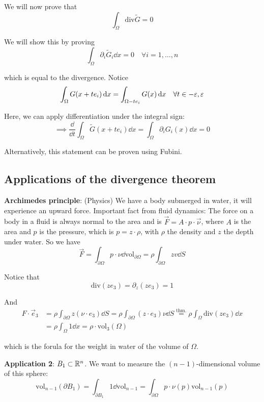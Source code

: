 \documentclass[12pt]{article}
\begin{document}
\begin{proofbox}
    We will now prove that
    $$
        \int_\Omega \mathrm{div} \tilde G = 0
    $$

    We will show this by proving
    $$
        \int_\Omega \partial_i \tilde G_i \dd x = 0 \quad \forall i = 1,\dots,n
    $$

    which is equal to the divergence. Notice
    $$
        \int_\Omega G (x + te_i) \mathop{}\!\mathrm{d} x = \int_{\Omega - te_i} G(x) \mathop{}\!\mathrm{d} x \quad \forall t \in {-\varepsilon, \varepsilon}
    $$

    Here, we can apply differentiation under the integral sign:
    $$
        \implies \frac{\dd}{\dd t} \int_\Omega \tilde G(x + te_i) \dd x = \int_\Omega \partial_i G_i(x) \dd x = 0
    $$

    Alternatively, this statement can be proven using Fubini.
\end{proofbox}

\subsection{Applications of the divergence theorem}

\textbf{Archimedes principle}: (Physics) We have a body submerged in water, it will experience an upward force. Important fact from fluid dynamics: The force on a body in a fluid is always normal to the area and is $\vec F = A \cdot p \cdot \vec{\nu}$, where $A$ is the area and $p$ is the pressure, which is $p = z \cdot \rho$, with $\rho$ the density and $z$ the depth under water. So we have
$$
    \vec F = \int_{\partial\Omega} p \cdot \nu \dd \mathrm{vol}_{\partial\Omega} = \rho \int_{\partial\Omega} zv \dd S
$$

Notice that
$$
    \mathrm{div}(z e_3) = \partial_z (z e_3) = 1
$$

And
$$
\begin{aligned}
    F \cdot \vec e_3 &= \rho \int_{\partial \Omega} z (\nu \cdot e_3) \dd S = \rho \int_{\partial \Omega} (z \cdot e_3) \nu \dd S \overset{\text{thm.}}= \rho \int_{\Omega} \mathrm{div}(z e_3) \dd x \\
    &= \rho \int_\Omega 1 \dd x = \rho \cdot \mathrm{vol}_3(\Omega)
\end{aligned}
$$

which is the forula for the weight in water of the volume of $\Omega$.

\textbf{Application 2}: $B_1 \subset \mathbb{R}^n$. We want to measure the $(n-1)$-dimensional volume of this sphere:
$$
    \mathrm{vol}_{n-1}(\partial B_1) = \int_{\partial B_1} 1 \dd \mathrm{vol}_{n-1} = \int_{\partial \Omega} p \cdot \nu(p) \mathrm{vol}_{n-1}(p)
$$
\end{document}
